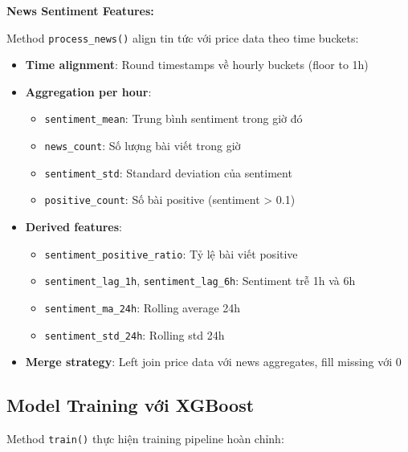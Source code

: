 \noindent\textbf{News Sentiment Features:}

Method \texttt{process\_news()} align tin tức với price data theo time buckets:

\begin{itemize}
    \item \textbf{Time alignment}: Round timestamps về hourly buckets (floor to 1h)
    \item \textbf{Aggregation per hour}:
    \begin{itemize}
        \item \texttt{sentiment\_mean}: Trung bình sentiment trong giờ đó
        \item \texttt{news\_count}: Số lượng bài viết trong giờ
        \item \texttt{sentiment\_std}: Standard deviation của sentiment
        \item \texttt{positive\_count}: Số bài positive (sentiment > 0.1)
    \end{itemize}
    
    \item \textbf{Derived features}:
    \begin{itemize}
        \item \texttt{sentiment\_positive\_ratio}: Tỷ lệ bài viết positive
        \item \texttt{sentiment\_lag\_1h}, \texttt{sentiment\_lag\_6h}: Sentiment trễ 1h và 6h
        \item \texttt{sentiment\_ma\_24h}: Rolling average 24h
        \item \texttt{sentiment\_std\_24h}: Rolling std 24h
    \end{itemize}
    
    \item \textbf{Merge strategy}: Left join price data với news aggregates, fill missing với 0
\end{itemize}

\subsection{Model Training với XGBoost}

Method \texttt{train()} thực hiện training pipeline hoàn chỉnh:

